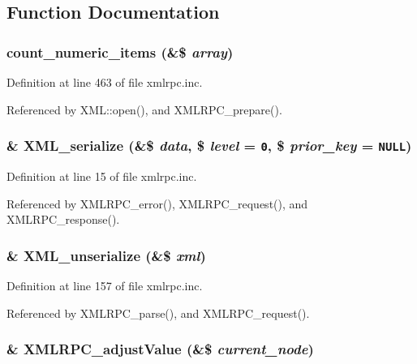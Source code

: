 \subsection{Function Documentation}
\hypertarget{xmlrpc_8inc_88839ba2c5c835c99f55578c65faa401}{
\subsubsection{\setlength{\rightskip}{0pt plus 5cm}count\_\-numeric\_\-items (\&\$ {\em array})}}
\label{xmlrpc_8inc_88839ba2c5c835c99f55578c65faa401}




Definition at line 463 of file xmlrpc.inc.

Referenced by XML::open(), and XMLRPC\_\-prepare().\hypertarget{xmlrpc_8inc_a1e9b05a06f28fabb86c10129f5890ef}{
\subsubsection{\setlength{\rightskip}{0pt plus 5cm}\& XML\_\-serialize (\&\$ {\em data}, \$ {\em level} = {\tt 0}, \$ {\em prior\_\-key} = {\tt NULL})}}
\label{xmlrpc_8inc_a1e9b05a06f28fabb86c10129f5890ef}




Definition at line 15 of file xmlrpc.inc.

Referenced by XMLRPC\_\-error(), XMLRPC\_\-request(), and XMLRPC\_\-response().\hypertarget{xmlrpc_8inc_ef8f3de498a12b230d049cdee6a25145}{
\subsubsection{\setlength{\rightskip}{0pt plus 5cm}\& XML\_\-unserialize (\&\$ {\em xml})}}
\label{xmlrpc_8inc_ef8f3de498a12b230d049cdee6a25145}




Definition at line 157 of file xmlrpc.inc.

Referenced by XMLRPC\_\-parse(), and XMLRPC\_\-request().\hypertarget{xmlrpc_8inc_d936fe41ae9c3e0b90bd72ffe82a2969}{
\subsubsection{\setlength{\rightskip}{0pt plus 5cm}\& XMLRPC\_\-adjustValue (\&\$ {\em current\_\-node})}}
\label{xmlrpc_8inc_d936fe41ae9c3e0b90bd72ffe82a2969}




